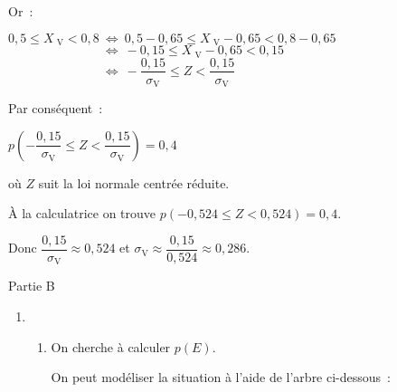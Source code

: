 \begin{corrige}
\begin{enumerate}
          Or~:
          \par
          $0,5 \leqslant X_{\text{ V}}<0,8~ \Leftrightarrow ~0,5 -0,65\leqslant X_{\text{ V}}-0,65<0,8-0,65$\\
          $\phantom{0,5 \leqslant X_{\text{ V}}<0,8}~ \Leftrightarrow  ~ -0,15\leqslant X_{\text{ V}}-0,65<0,15$\\
          $\phantom{0,5 \leqslant X_{\text{ V}}<0,8}~ \Leftrightarrow  ~ -\dfrac{0,15}{\sigma_{\text{V}}} \leqslant Z<\dfrac{0,15}{\sigma_{\text{V}}} $
          \par
          Par conséquent~:
          \par
          $p\left(-\dfrac{0,15}{\sigma_{\text{V}}} \leqslant Z<\dfrac{0,15}{\sigma_{\text{V}}} \right) =0,4$
          \par
          où $Z$ suit la loi normale centrée réduite.
          \par
          \`A  la calculatrice on trouve $p\left(-0,524 \leqslant Z<0,524\right) =0,4$.
          \par
          Donc $\dfrac{0,15}{\sigma_{\text{V}}}\approx 0,524$  et $\sigma_{\text{V}} \approx \dfrac{0,15}{0,524}\approx 0,286$.
     \end{enumerate}
     \begin{center}\begin{h3}Partie B \end{h3}\end{center}
     \begin{enumerate}
          \item
          \begin{enumerate}[label=\alph*.]
               \item
               On cherche à calculer $p(E)$.
               \par
               On peut modéliser la situation à l'aide de l'arbre ci-dessous~:
               \begin{center}
                    \begin{extern}%
\end{extern}
\end{center}
\end{enumerate}
\end{enumerate}
\end{corrige}
